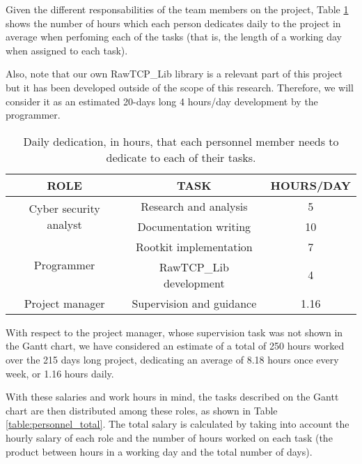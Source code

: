 Given the different responsabilities of the team members on the project, Table \ref{table:hours_personnel} shows the number of hours which each person dedicates daily  to the project in average when perfoming each of the tasks (that is, the length of a working day when assigned to each task).

Also, note that our own RawTCP\_Lib library is a relevant part of this project but it has been developed outside of the scope of this research. Therefore, we will consider it as an estimated 20-days long 4 hours/day development by the programmer.

\begin{table}[htbp]
\begin{tabular}{|c|c|c|}
\hline
\textbf{ROLE} & \textbf{TASK} & \textbf{HOURS/DAY}\\
\hline
\hline
\multirow{2}{*}{Cyber security analyst} & \multicolumn{1}{c|}{Research and analysis} & \multicolumn{1}{c|}{5}\\
\cline{2-3}
& \multicolumn{1}{c|}{Documentation writing} & \multicolumn{1}{c|}{10} \\
\hline
\multirow{2}{*}{Programmer} & \multicolumn{1}{c|}{Rootkit implementation} & \multicolumn{1}{c|}{7} \\
\cline{2-3}
& \multicolumn{1}{c|}{RawTCP\_Lib development} & \multicolumn{1}{c|}{4} \\
\hline
Project manager & Supervision and guidance & 1.16 \\
\hline
\end{tabular}
\caption{Daily dedication, in hours, that each personnel member needs to dedicate to each of their tasks.}
\label{table:hours_personnel}
\end{table}

With respect to the project manager, whose supervision task was not shown in the Gantt chart, we have considered an estimate of a total of 250 hours worked over the 215 days long project, dedicating an average of 8.18 hours once every week, or 1.16 hours daily.

With these salaries and work hours in mind, the tasks described on the Gantt chart are then distributed among these roles, as shown in Table \ref{table:personnel_total}. The total salary is calculated by taking into account the hourly salary of each role and the number of hours worked on each task (the product between hours in a working day and the total number of days).

